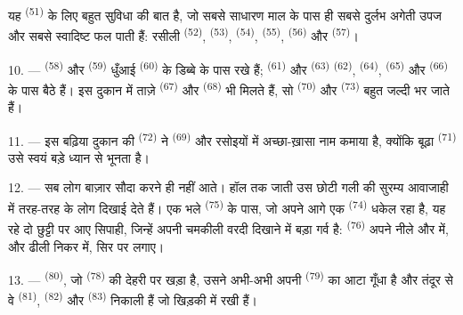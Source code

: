 यह  \textsuperscript{(51)} के लिए बहुत सुविधा की बात है, जो
सबसे साधारण माल के पास ही सबसे दुर्लभ अगेती उपज और सबसे स्वादिष्ट फल पाती हैं:
रसीली  \textsuperscript{(52)}, 
\textsuperscript{(53)},  \textsuperscript{(54)}, 
\textsuperscript{(55)},  \textsuperscript{(56)} और
 \textsuperscript{(57)}।

\VUsaut{4.0mm}
\VUsaut{3.0mm}

10. ---  \textsuperscript{(58)} और  \textsuperscript{(59)}
धुँआई  \textsuperscript{(60)} के डिब्बे के पास रखे हैं;
 \textsuperscript{(61)} और  \textsuperscript{(63)}
 \textsuperscript{(62)},  \textsuperscript{(64)},
 \textsuperscript{(65)} और 
\textsuperscript{(66)} के पास बैठे हैं। इस दुकान में ताज़े 
\textsuperscript{(67)} और  \textsuperscript{(68)} भी मिलते हैं, सो
 \textsuperscript{(70)} और 
\textsuperscript{(73)} बहुत जल्दी भर जाते हैं।

11. --- इस बढ़िया दुकान की  \textsuperscript{(72)} ने
 \textsuperscript{(69)} और रसोइयों में अच्छा-ख़ासा नाम कमाया
है, क्योंकि बूढ़ा  \textsuperscript{(71)} उसे स्वयं बड़े ध्यान
से भूनता है।

\VUsaut{4.0mm}
\VUsaut{3.0mm}

12. --- सब लोग बाज़ार सौदा करने ही नहीं आते। हॉल तक जाती उस छोटी गली की सुरम्य
आवाजाही में तरह-तरह के लोग दिखाई देते हैं। एक भले 
\textsuperscript{(75)} के पास, जो अपने आगे एक  \textsuperscript{(74)}
धकेल रहा है, यह रहे दो छुट्टी पर आए सिपाही, जिन्हें अपनी चमकीली वरदी दिखाने में
बड़ा गर्व है:  \textsuperscript{(76)} अपने नीले  और
 में, और  ढीली निकर में, सिर पर
 लगाए।

13. ---  \textsuperscript{(80)}, जो 
\textsuperscript{(78)} की देहरी पर खड़ा है, उसने अभी-अभी अपनी 
\textsuperscript{(79)} का आटा गूँधा है और तंदूर से वे 
\textsuperscript{(81)},  \textsuperscript{(82)} और
 \textsuperscript{(83)} निकाली हैं जो खिड़की में रखी हैं।

